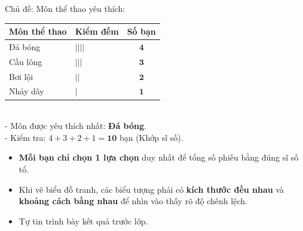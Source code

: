 \documentclass[10pt,a4paper]{article}
\begin{document}
\vspace{-1.5mm}
\noindent
\begin{minipage}[t]{0.49\textwidth}\vspace{0pt}
\begin{tcolorbox}[
  enhanced,
  colback=green!4!white,
  colframe=green!60!black,
  arc=2mm, boxrule=0.8pt,
  left=2mm, right=2mm, top=1.8mm, bottom=1.8mm,
  title={\footnotesize\bfseries\color{white}\faCheckCircle\ 4. Báo cáo mẫu của Tổ 1 (10 bạn)}
]
{\footnotesize
Chủ đề: Môn thể thao yêu thích:\\
\begin{tabular}{|l|l|c|}
  \hline
  \textbf{Môn thể thao} & \textbf{Kiểm đếm} & \textbf{Số bạn} \\
  \hline
  Đá bóng & $||||$ & $\mathbf{4}$ \\
  Cầu lông & $|||$ & $\mathbf{3}$ \\
  Bơi lội & $||$ & $\mathbf{2}$ \\
  Nhảy dây & $|$ & $\mathbf{1}$ \\
  \hline
\end{tabular}
\vspace{1mm}\\
- Môn được yêu thích nhất: \textbf{Đá bóng}.\\
- Kiểm tra: $4 + 3 + 2 + 1 = \mathbf{10}$ bạn (Khớp sĩ số).
}
\end{tcolorbox}
\end{minipage}
\hfill
\begin{minipage}[t]{0.49\textwidth}\vspace{0pt}
\begin{tcolorbox}[
  enhanced,
  colback=rose!4!white,
  colframe=rose!70!black,
  arc=2mm, boxrule=0.8pt,
  left=2mm, right=2mm, top=1.8mm, bottom=1.8mm,
  title={\footnotesize\bfseries\color{white}\faExclamationTriangle\ 5. Lời khuyên khi thực hành}
]
{\footnotesize
\begin{itemize}\setlength{\itemsep}{1.5pt}\setlength{\leftskip}{-2.5mm}
  \item \textbf{Mỗi bạn chỉ chọn 1 lựa chọn} duy nhất để tổng số phiếu bằng đúng sĩ số tổ.
  \item Khi vẽ biểu đồ tranh, các biểu tượng phải có \textbf{kích thước đều nhau} và \textbf{khoảng cách bằng nhau} để nhìn vào thấy rõ độ chênh lệch.
  \item Tự tin trình bày kết quả trước lớp.
\end{itemize}
}
\end{tcolorbox}
\end{minipage}
\end{document}
